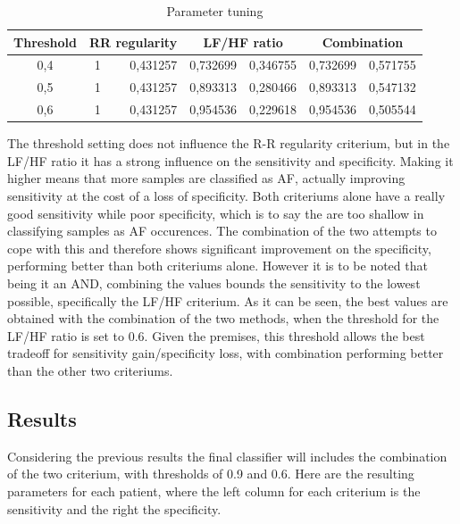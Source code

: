 \documentclass[a4paper,titlepage]{article}
\begin{document}
\begin{table}[htbp]
  \centering
  \caption{Parameter tuning}
    \begin{tabular}{c |rr|rr|rr|}
    \multicolumn{1}{c|}{Threshold} & \multicolumn{2}{c|}{RR regularity} & \multicolumn{2}{c|}{LF/HF ratio} & \multicolumn{2}{c|}{Combination} \\ \hline
    0,4   & 1     & 0,431257 & 0,732699 & 0,346755 & 0,732699 & 0,571755 \\
    0,5   & 1     & 0,431257 & 0,893313 & 0,280466 & 0,893313 & 0,547132 \\
    0,6   & 1     & 0,431257 & 0,954536 & 0,229618 & 0,954536 & 0,505544 \\
    \end{tabular}%
  \label{tab:addlabel}%
\end{table}%

The threshold setting does not influence the R-R regularity criterium, but in the LF/HF ratio it has a strong influence on the sensitivity and specificity. Making it higher means that more samples are classified as AF, actually improving sensitivity at the cost of a loss of specificity.
Both criteriums alone have a really good sensitivity while poor specificity, which is to say the are too shallow in classifying samples as AF occurences. The combination of the two attempts to cope with this and therefore shows significant improvement on the specificity, performing better than both criteriums alone. However it is to be noted that being it an AND, combining the values bounds the sensitivity to the lowest possible, specifically the LF/HF criterium.
As it can be seen, the best values are obtained with the combination of the two methods, when the threshold for the LF/HF ratio is set to 0.6.  Given the premises, this threshold allows the best tradeoff for sensitivity gain/specificity loss, with combination performing better than the other two criteriums.

\subsection{Results}
Considering the previous results the final classifier will includes the combination of the two criterium, with thresholds of 0.9 and 0.6.
Here are the resulting parameters for each patient, where the left column for each criterium is the sensitivity and the right the specificity.
\end{document}
